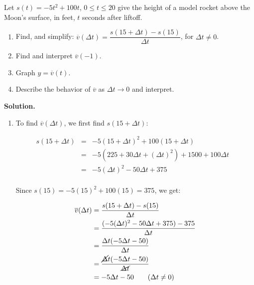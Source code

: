 \begin{ex} \label{averagevelocityrocketexreprise} Let $s(t) = -5t^2+100t$, $0 \leq t \leq 20$ give the height of a model rocket above the Moon's surface, in feet,  $t$ seconds after liftoff.  

\begin{enumerate}

\item  Find, and simplify:  $\overline{v}(\Delta t)  = \dfrac{s(15+ \Delta t) - s(15)}{\Delta t}$, for $\Delta t \neq 0$.

\item  Find and interpret $\overline{v}(-1)$.

\item  Graph $y = \overline{v}(t)$.

\item  Describe the behavior of $\overline{v}$ as $\Delta t \rightarrow 0$ and interpret.

\end{enumerate}

{\bf Solution.}

\begin{enumerate}

\item  To find $\overline{v}(\Delta t)$, we first find $s(15+\Delta t)$: 

\[ \begin{array}{rclr}  
  s(15+\Delta t) & = & -5(15+\Delta t)^2 + 100(15+\Delta t) & \\ 
  & = & -5(225+30 \Delta t + (\Delta t)^2) + 1500 + 100 \Delta t& \\
 & = & -5(\Delta t)^2 -50 \Delta t +375 & \\
 \end{array} \]

Since $s(15) = -5(15)^2 + 100(15) = 375$, we get:

\begin{align*}
\overline{v}(\Delta t)& = \dfrac{s(15+ \Delta t) - s(15)}{\Delta t} \\
& = \dfrac{(-5(\Delta t)^2-50 \Delta t + 375) - 375}{\Delta t} \\
& = \dfrac{\Delta t (-5 \Delta t - 50)}{\Delta t} \\
& = \dfrac{\cancel{\Delta} t (-5 \Delta t - 50)}{\cancel{\Delta t}} \\
& = -5 \Delta t - 50 \tag{$\Delta t \neq 0$} \\
\end{align*}


\end{enumerate}
\end{ex}
